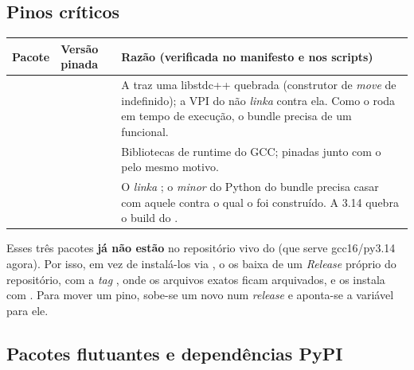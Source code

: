 \subsection{Pinos críticos}

\begin{tabularx}{\linewidth}{Y Y Z}
\toprule
\textbf{Pacote} & \textbf{Versão pinada} & \textbf{Razão (verificada no manifesto e nos scripts)} \\
\midrule
{} &  & A  traz uma libstdc++ quebrada (construtor de \emph{move} de  indefinido); a VPI do  não \emph{linka} contra ela. Como o  roda em tempo de execução, o bundle precisa de um  funcional. \\
 &  & Bibliotecas de runtime do GCC; pinadas junto com o  pelo mesmo motivo. \\
 &  & O  \emph{linka} ; o \emph{minor} do Python do bundle precisa casar com aquele contra o qual o  foi construído. A 3.14 quebra o build do . \\
\bottomrule
\end{tabularx}

\medskip

Esses três pacotes \textbf{já não estão} no repositório vivo do  (que
serve gcc16/py3.14 agora). Por isso, em vez de instalá-los via ,
o  os baixa de um \emph{Release} próprio do
repositório, com a \emph{tag} , onde os arquivos
 exatos ficam arquivados, e os instala com .
Para mover um pino, sobe-se um novo  num \emph{release}
 e aponta-se a variável  para ele.

\subsection{Pacotes flutuantes e dependências PyPI}

